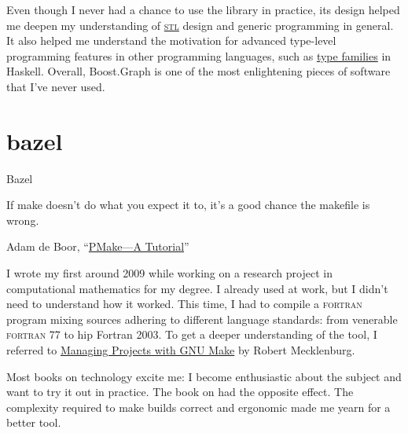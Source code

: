 \documentclass{article}
\begin{document}
Even though I never had a chance to use the library in practice, its design helped me deepen my understanding of \href{https://en.wikipedia.org/wiki/Standard_Template_Library}{\textsc{stl}} design and generic programming in general.
It also helped me understand the motivation for advanced type-level programming features in other programming languages, such as \href{https://wiki.haskell.org/GHC/Type_families}{type families} in Haskell.
Overall, Boost.Graph is one of the most enlightening pieces of software that I've never used.

\section{bazel}{Bazel}

\epigraph{
  If make doesn't do what you expect it to, it's a good chance the makefile is wrong.
}{
  Adam de Boor, ``\href{https://docs-archive.freebsd.org/44doc/psd/12.make/paper.pdf}{PMake---A Tutorial}''
}

I wrote my first  around 2009 while working on a research project in computational mathematics for my degree.
I already used \href{https://en.wikipedia.org/wiki/Make_(software)}{} at work, but I didn't need to understand how it worked.
This time, I had to compile a \textsc{fortran} program mixing sources adhering to different language standards: from venerable \textsc{fortran} 77 to hip Fortran 2003.
To get a deeper understanding of the tool, I referred to \href{https://www.oreilly.com/library/view/managing-projects-with/0596006101/}{Managing Projects with GNU Make} by Robert Mecklenburg.

Most books on technology excite me: I become enthusiastic about the subject and want to try it out in practice. 
The book on  had the opposite effect.
The complexity required to make builds correct and ergonomic made me yearn for a better tool.
\end{document}
